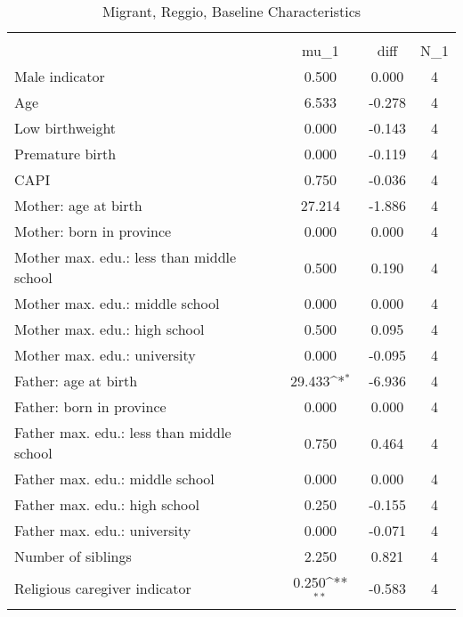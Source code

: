 \begin{table}[htbp]\centering
\def\sym#1{\ifmmode^{#1}\else\(^{#1}\)\fi}
\caption{Migrant, Reggio, Baseline Characteristics}
\begin{tabular}{l*{1}{ccc}}
\toprule
                    &\multicolumn{3}{c}{}                           \\
                    &        mu\_1         &        diff&         N\_1\\
\midrule
Male indicator      &       0.500         &       0.000&           4\\
Age                 &       6.533         &      -0.278&           4\\
Low birthweight     &       0.000         &      -0.143&           4\\
Premature birth     &       0.000         &      -0.119&           4\\
CAPI                &       0.750         &      -0.036&           4\\
Mother: age at birth&      27.214         &      -1.886&           4\\
Mother: born in province&       0.000         &       0.000&           4\\
Mother max. edu.: less than middle school&       0.500         &       0.190&           4\\
Mother max. edu.: middle school&       0.000         &       0.000&           4\\
Mother max. edu.: high school&       0.500         &       0.095&           4\\
Mother max. edu.: university&       0.000         &      -0.095&           4\\
Father: age at birth&      29.433\sym{*}  &      -6.936&           4\\
Father: born in province&       0.000         &       0.000&           4\\
Father max. edu.: less than middle school&       0.750         &       0.464&           4\\
Father max. edu.: middle school&       0.000         &       0.000&           4\\
Father max. edu.: high school&       0.250         &      -0.155&           4\\
Father max. edu.: university&       0.000         &      -0.071&           4\\
Number of siblings  &       2.250         &       0.821&           4\\
Religious caregiver indicator&       0.250\sym{**} &      -0.583&           4\\

\end{tabular}
\end{table}
